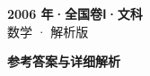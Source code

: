 \documentclass[zihao=-4, a4paper]{ctexart}
\begin{document}
\begin{center}
  {\Large\bfseries 2006 年·全国卷Ⅰ·文科}\\[4pt]
  {\large 数学 · 解析版}
\end{center}
\medskip
{}

\clearpage
{}
\begin{center}{\Large\bfseries 参考答案与详细解析}\end{center}
\medskip

\end{document}
